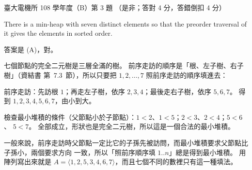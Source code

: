 \begin{pastexam}[label={px:ntu-108-ee-dsb-03}]{臺大電機所 108 學年度（B）第 3 題}
（是非；答對 4 分，答錯倒扣 4 分）

There is a min-heap with seven distinct elements so that the preorder traversal of it gives the
elements in sorted order.
\end{pastexam}

\begin{pastsoln}
答案是 (A)，對。

七個節點的完全二元樹是三層全滿的樹。 前序走訪的順序是「根、左子樹、右子樹」（資結書
第~7.3~節），所以只要把 $1, 2, \ldots, 7$ 照前序走訪的順序填進去：
\begin{center}
\end{center}
前序走訪：先訪根 $1$；再走左子樹，依序 $2, 3, 4$；最後走右子樹，依序 $5, 6, 7$。 得到
$1, 2, 3, 4, 5, 6, 7$，由小到大。

檢查最小堆積的條件（父節點小於子節點）：$1 < 2$、$1 < 5$；$2 < 3$、$2 < 4$；$5 < 6$、
$5 < 7$。 全部成立，形狀也是完全二元樹，所以這是一個合法的最小堆積。

一般來說，前序走訪時父節點一定比它的子孫先被訪問，而最小堆積要求父節點比子孫小，兩個要求方向
一致，所以「照前序順序填 $1..n$」總是得到最小堆積。 用陣列寫出來就是
$A = \langle 1, 2, 5, 3, 4, 6, 7\rangle$，而且七個不同的數裡只有這一種填法。
\end{pastsoln}
